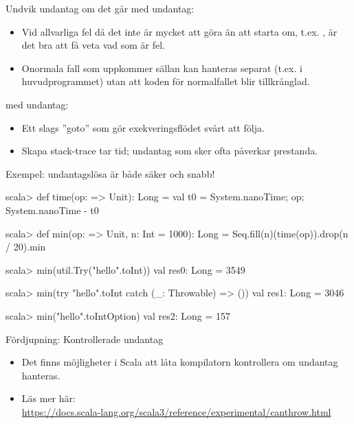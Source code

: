 \begin{Slide}{Undvik undantag om det går}
\SlideFontSmall
{} med undantag: 
\begin{itemize}
\item Vid allvarliga fel då det inte är mycket att göra än att starta om, t.ex. , är det bra att få veta vad som är fel.
\item Onormala fall som uppkommer sällan kan hanteras separat (t.ex. i huvudprogrammet) utan att koden för normalfallet blir tillkrånglad. 
\end{itemize}
 med undantag: 
\begin{itemize}
\item Ett slags ''goto'' som gör exekveringsflödet svårt att följa.
\item Skapa stack-trace tar tid; undantag som sker ofta påverkar prestanda.
\end{itemize}
\pause Exempel: undantagslösa  är både säker och snabb!
\begin{REPLsmall}
scala> def time(op: => Unit): Long = {val t0 = System.nanoTime; op; System.nanoTime - t0}

scala> def min(op: => Unit, n: Int = 1000): Long = Seq.fill(n)(time(op)).drop(n / 20).min

scala> min(util.Try("hello".toInt))
val res0: Long = 3549

scala> min(try "hello".toInt catch (_: Throwable) => ())
val res1: Long = 3046

scala> min("hello".toIntOption)
val res2: Long = 157
\end{REPLsmall}
\end{Slide}

\begin{Slide}{Fördjupning: Kontrollerade undantag}
\begin{itemize}
\item Det finns möjligheter i Scala att låta kompilatorn kontrollera om undantag hanteras.
\item Läs mer här: \\ \url{https://docs.scala-lang.org/scala3/reference/experimental/canthrow.html}
\end{itemize}
  
\end{Slide}
